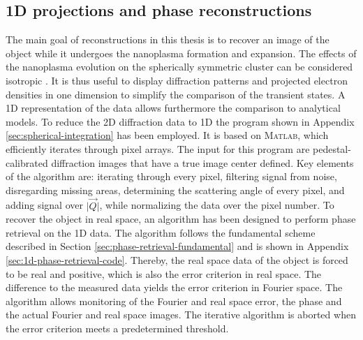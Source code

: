 \subsection{1D projections and phase reconstructions}\label{sec:1d-proj-and-phase-reconstruction}
The main goal of reconstructions in this thesis is to recover an image of the object while it undergoes the nanoplasma formation and expansion. The effects of the nanoplasma evolution on the spherically symmetric cluster can be considered isotropic \citep{Gorkhover-2016-NatPho}. It is thus useful to display diffraction patterns and projected electron densities in one dimension to simplify the comparison of the transient states. A 1D representation of the data allows furthermore the comparison to analytical models. To reduce the 2D diffraction data to 1D the program shown in Appendix \ref{sec:spherical-integration} has been employed. It is based on \textsc{Matlab}, which efficiently iterates through pixel arrays. The input for this program are pedestal-calibrated diffraction images that have a true image center defined. Key elements of the algorithm are: iterating through every pixel, filtering signal from noise, disregarding missing areas, determining the scattering angle of every pixel, and adding signal over $\lvert \vec{Q}\rvert$, while normalizing the data over the pixel number. To recover the object in real space, an algorithm has been designed to perform phase retrieval on the 1D data.
The algorithm follows the fundamental scheme described in Section \ref{sec:phase-retrieval-fundamental} and is shown in Appendix \ref{sec:1d-phase-retrieval-code}. Thereby, the real space data of the object is forced to be real and positive, which is also the error criterion in real space. The difference to the measured data yields the error criterion in Fourier space. The algorithm allows monitoring of the Fourier and real space error, the phase and the actual Fourier and real space images. The iterative algorithm is aborted when the error criterion meets a predetermined threshold.
%
%
%
